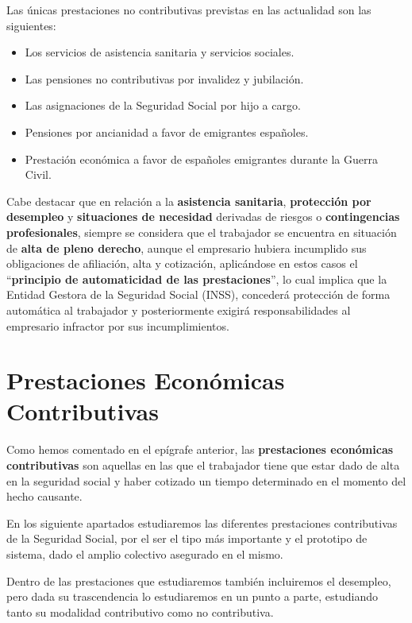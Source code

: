 \begin{enumerate}[label=(\Alph*)]
    Las únicas prestaciones no contributivas previstas en las actualidad son las siguientes:
    \begin{itemize}
        \item Los servicios de asistencia sanitaria y servicios sociales.
        \item Las pensiones no contributivas por invalidez y jubilación.
        \item Las asignaciones de la Seguridad Social por hijo a cargo.
        \item Pensiones por ancianidad a favor de emigrantes españoles.
        \item Prestación económica a favor de españoles emigrantes durante la Guerra Civil.
    \end{itemize}
\end{enumerate}

Cabe destacar que en relación a la \textbf{asistencia sanitaria}, \textbf{protección por desempleo} y \textbf{situaciones de necesidad} derivadas de riesgos o \textbf{contingencias profesionales}, siempre se considera que el trabajador se encuentra en situación de \textbf{alta de pleno derecho}, aunque el empresario hubiera incumplido sus obligaciones de afiliación, alta y cotización, aplicándose en estos casos el ``\textbf{principio de automaticidad de las prestaciones}'', lo cual implica que la Entidad Gestora de la Seguridad Social (INSS), concederá protección de forma automática al trabajador y posteriormente exigirá responsabilidades al empresario infractor por sus incumplimientos.

\section{Prestaciones Económicas Contributivas}
Como hemos comentado en el epígrafe anterior, las \textbf{prestaciones económicas contributivas} son aquellas en las que el trabajador tiene que estar dado de alta en la seguridad social y haber cotizado un tiempo determinado en el momento del hecho causante.

En los siguiente apartados estudiaremos las diferentes prestaciones contributivas de la Seguridad Social, por el ser el tipo más importante y el prototipo de sistema, dado el amplio colectivo asegurado en el mismo.

Dentro de las prestaciones que estudiaremos también incluiremos el desempleo, pero dada su trascendencia lo estudiaremos en un punto a parte, estudiando tanto su modalidad contributivo como no contributiva.

